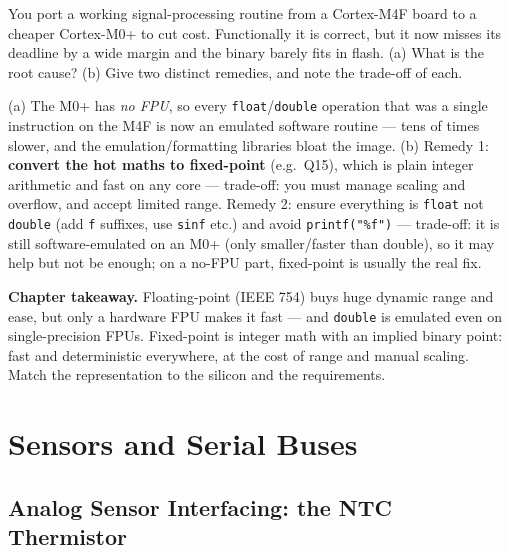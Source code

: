 \documentclass[11pt,a4paper,oneside]{book}
\newcommand{\code}[1]{\texttt{#1}}
\begin{document}
\begin{exercise}
You port a working signal-processing routine from a Cortex-M4F board to a
cheaper Cortex-M0+ to cut cost. Functionally it is correct, but it now misses its
deadline by a wide margin and the binary barely fits in flash. (a) What is the
root cause? (b) Give two distinct remedies, and note the trade-off of each.
\end{exercise}
\begin{solution}
(a) The M0+ has \emph{no FPU}, so every \code{float}/\code{double} operation that
was a single instruction on the M4F is now an emulated software routine --- tens
of times slower, and the emulation/formatting libraries bloat the image.
(b) Remedy 1: \textbf{convert the hot maths to fixed-point} (e.g.\ Q15), which is
plain integer arithmetic and fast on any core --- trade-off: you must manage
scaling and overflow, and accept limited range. Remedy 2: ensure everything is
\code{float} not \code{double} (add \code{f} suffixes, use \code{sinf} etc.) and
avoid \code{printf("\%f")} --- trade-off: it is still software-emulated on an M0+
(only smaller/faster than double), so it may help but not be enough; on a no-FPU
part, fixed-point is usually the real fix.
\end{solution}

\begin{keyidea}
\textbf{Chapter takeaway.} Floating-point (IEEE 754) buys huge dynamic range and
ease, but only a hardware FPU makes it fast --- and \code{double} is emulated even
on single-precision FPUs. Fixed-point is integer math with an implied binary
point: fast and deterministic everywhere, at the cost of range and manual scaling.
Match the representation to the silicon and the requirements.
\end{keyidea}

\part{Sensors and Serial Buses}

\chapter{Analog Sensor Interfacing: the NTC Thermistor}
\label{ch:ntc}
\end{document}
